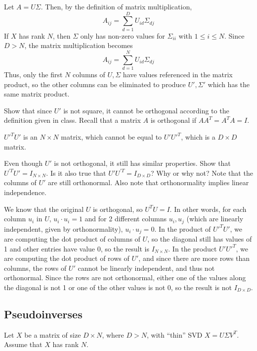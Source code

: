 \begin{solution}
    Let $A = U \Sigma$. Then, by the definition of matrix multiplication,
    \[
        A_{ij} = \sum_{d=1}^D U_{id} \Sigma_{dj}
    \]
    If $X$ has rank $N$, then $\Sigma$ only has non-zero values for $\Sigma_{ii}$ with $1 \leq i \leq N$. Since $D > N$, the matrix multiplication becomes
    \[
        A_{ij} = \sum_{d=1}^N U_{id} \Sigma_{dj}
    \]
    Thus, only the first $N$ columns of $U, \Sigma$ have values referenced in the matrix product, so the other columns can be eliminated to produce $U', \Sigma'$ which has the same matrix product.
\end{solution}


\problem[3] Show that since $U'$ is not square, it cannot be orthogonal according to the definition given in class. Recall that a matrix $A$ is orthogonal if $A A^T = A^T A = I$.

\begin{solution}
    $U'^T U'$ is an $N \times N$ matrix, which cannot be equal to $U' U'^T$, which is a $D \times D$ matrix.
\end{solution}

\newpage

\problem[4] Even though $U'$ is not orthogonal, it still has similar properties. Show that $U^{'T} U' = I_{N \times N}$. Is it also true that $U' U^{'T} = I_{D \times D}$? Why or why not? Note that the columns of $U'$ are still orthonormal. Also note that orthonormality implies linear independence.

\begin{solution}
    We know that the original $U$ is orthogonal, so $U^T U = I$. In other words, for each column $u_i$ in $U$, $u_i \cdot u_i = 1$ and for 2 different columns $u_i, u_j$ (which are linearly independent, given by orthonormality), $u_i \cdot u_j = 0$. In the product of $U'^T U'$, we are computing the dot product of columns of $U$, so the diagonal still has values of 1 and other entries have value 0, so the result is $I_{N \times N}$. In the product $U' U'^T$, we are computing the dot product of rows of $U'$, and since there are more rows than columns, the rows of $U'$ cannot be linearly independent, and thus not orthonormal. Since the rows are not orthonormal, either one of the values along the diagonal is not 1 or one of the other values is not 0, so the result is not $I_{D \times D}$.
\end{solution}

\subsection{Pseudoinverses} Let $X$ be a matrix of size $D \times N$, where $D > N$, with ``thin'' SVD $X = U\Sigma V^T$. Assume that $X$ has rank $N$.

